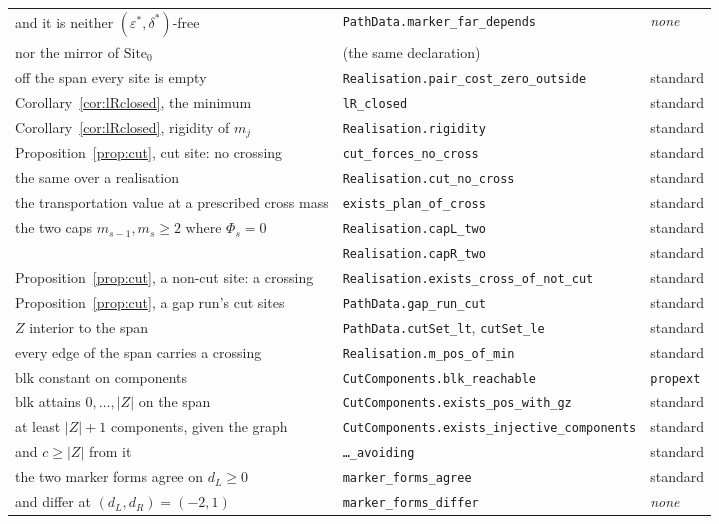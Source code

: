 \documentclass[11pt]{article}
\theoremstyle{plain}
\theoremstyle{definition}
\theoremstyle{remark}
\begin{document}
\begin{center}
\begin{tabular}{lll}
\quad and it is neither $(\varepsilon^\ast,\delta^\ast)$-free & \texttt{PathData.marker\_far\_depends} & \emph{none}\\
\quad nor the mirror of $\mathrm{Site}_0$ & \quad(the same declaration) & \\
off the span every site is empty & \texttt{Realisation.pair\_cost\_zero\_outside} & standard\\
Corollary~\ref{cor:lRclosed}, the minimum & \texttt{lR\_closed} & standard\\
Corollary~\ref{cor:lRclosed}, rigidity of $m_j$ & \texttt{Realisation.rigidity} & standard\\
Proposition~\ref{prop:cut}, cut site: no crossing & \texttt{cut\_forces\_no\_cross} & standard\\
\quad the same over a realisation & \texttt{Realisation.cut\_no\_cross} & standard\\
the transportation value at a prescribed cross mass & \texttt{exists\_plan\_of\_cross} & standard\\
the two caps $m_{s-1},m_s\ge2$ where $\Phi_s=0$ & \texttt{Realisation.capL\_two} & standard\\
& \texttt{Realisation.capR\_two} & standard\\
Proposition~\ref{prop:cut}, a non-cut site: a crossing & \texttt{Realisation.exists\_cross\_of\_not\_cut} & standard\\
Proposition~\ref{prop:cut}, a gap run's cut sites & \texttt{PathData.gap\_run\_cut} & standard\\
$Z$ interior to the span & \texttt{PathData.cutSet\_lt}, \texttt{cutSet\_le} & standard\\
every edge of the span carries a crossing & \texttt{Realisation.m\_pos\_of\_min} & standard\\
$\mathrm{blk}$ constant on components & \texttt{CutComponents.blk\_reachable} & \texttt{propext}\\
$\mathrm{blk}$ attains $0,\dots,|Z|$ on the span & \texttt{CutComponents.exists\_pos\_with\_gz} & standard\\
at least $|Z|+1$ components, given the graph & \texttt{CutComponents.exists\_injective\_components} & standard\\
\quad and $c\ge|Z|$ from it & \texttt{\dots\_avoiding} & standard\\
the two marker forms agree on $d_L\ge0$ & \texttt{marker\_forms\_agree} & standard\\
and differ at $(d_L,d_R)=(-2,1)$ & \texttt{marker\_forms\_differ} & \emph{none}\\
\hline
\end{tabular}
\end{center}
\end{document}
